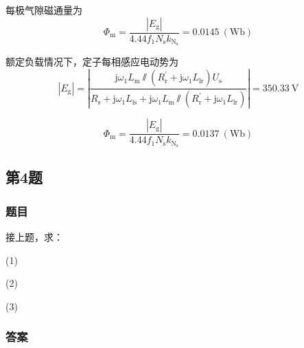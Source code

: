 \documentclass[12pt, a4paper, UTF8, fontset=adobe, oneside]{ctexbook} %
\begin{document}
每极气隙磁通量为
\begin{equation}
  \Phi_{\mathrm{m}} = \frac{\left|E_{\mathrm{g}}\right|}{4.44f_1N_{\mathrm{s}}k_{\mathrm{N}_{\mathrm{s}}}} = 0.0145\ \mathrm{(Wb)}
\end{equation}

额定负载情况下，定子每相感应电动势为
\begin{equation}
  \left| E_{\mathrm{g}} \right| = \left|{\dfrac{\mathrm{j}\omega_1L_{\mathrm{m}} \sslash (R_{\mathrm{r}}^{'}+\mathrm{j}\omega_1L_{\mathrm{lr}})U_{\mathrm{s}}}{R_{\mathrm{s}}+\mathrm{j}\omega_1L_{\mathrm{ls}}+\mathrm{j}\omega_1L_{\mathrm{m}} \sslash (R_{\mathrm{r}}^{'}+\mathrm{j}\omega_1L_{\mathrm{lr}})}} \right| = 350.33\ \mathrm{V}
\end{equation}

\begin{equation}
  \Phi_{\mathrm{m}} = \frac{\left|E_{\mathrm{g}}\right|}{4.44f_1N_{\mathrm{s}}k_{\mathrm{N}_{\mathrm{s}}}} = 0.0137\ \mathrm{(Wb)}
\end{equation}

\subsection{第4题}
\subsubsection{题目}
接上题，求：

(1) 

(2)

(3)
\subsubsection{答案}



\end{document}

